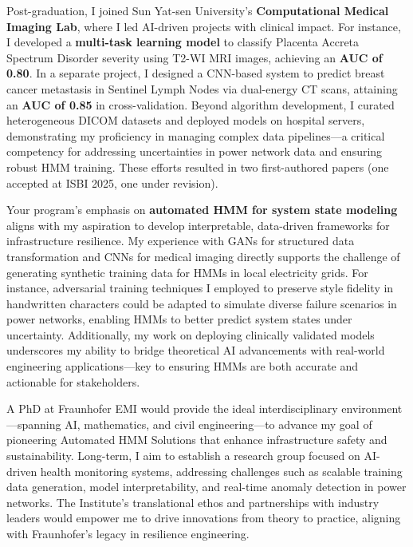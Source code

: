 \documentclass[11pt,a4paper, final]{moderncv}
\begin{document}
Post-graduation, I joined Sun Yat-sen University's \textbf{Computational Medical Imaging Lab}, 
where I led AI-driven projects with clinical impact. 
For instance, I developed a \textbf{multi-task learning model} to 
classify Placenta Accreta Spectrum Disorder severity using T2-WI MRI images, achieving an \textbf{AUC of 0.80}. 
In a separate project, 
I designed a CNN-based system to predict breast cancer metastasis in Sentinel Lymph Nodes via dual-energy CT scans, 
attaining an \textbf{AUC of 0.85} in cross-validation. 
Beyond algorithm development, I curated heterogeneous DICOM datasets and deployed models on hospital servers, demonstrating my proficiency in managing complex data pipelines—a critical competency for addressing uncertainties in power network data and ensuring robust HMM training.  
These efforts resulted in two first-authored papers (one accepted at ISBI 2025, one under revision).

Your program's emphasis on \textbf{automated HMM for system state modeling} 
aligns with my aspiration to develop interpretable, data-driven frameworks for infrastructure resilience. 
My experience with GANs for structured data transformation and CNNs for medical imaging directly supports the challenge of generating synthetic training data for HMMs in local electricity grids. 
For instance, adversarial training techniques I employed to preserve style fidelity in handwritten characters could be adapted to simulate diverse failure scenarios in power networks, enabling HMMs to better predict system states under uncertainty. 
Additionally, my work on deploying clinically validated models underscores my ability to bridge theoretical AI advancements with real-world engineering applications—key to ensuring HMMs are both accurate and actionable for stakeholders.

A PhD at Fraunhofer EMI would provide the ideal interdisciplinary environment—spanning AI, mathematics, and civil engineering—to advance my goal of pioneering Automated HMM Solutions that enhance infrastructure safety and sustainability. 
Long-term, I aim to establish a research group focused on AI-driven health monitoring systems, addressing challenges such as scalable training data generation, model interpretability, and real-time anomaly detection in power networks. 
The Institute's translational ethos and partnerships with industry leaders would empower me to drive innovations from theory to practice, aligning with Fraunhofer's legacy in resilience engineering.
\end{document}
